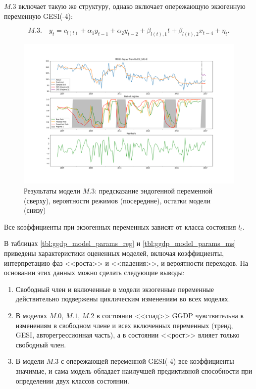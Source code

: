 \documentclass[a4paper,14pt]{extreport}
\begin{document}
$M.3$ включает такую же структуру, однако включает опережающую экзогенную переменную GESI(-4):

\begin{equation}
	M.3. \quad y_t = c_{l(t)} + \alpha_1 y_{t-1} + \alpha_2 y_{t-2} + \beta_{l(t), 1} t + \beta_{l(t), 2} x_{t-4} + \eta_t .
\end{equation}

\begin{figure}[H]
	\includegraphics[width=\linewidth]{img/manual/model_m3.png}
	\caption{Результаты модели $M.3$: предсказание эндогенной переменной (сверху), вероятности режимов (посередине), остатки модели (снизу)}
	\label{fig:sm_model_m3}
\end{figure}

Все коэффициенты при экзогенных переменных зависят от класса состояния $l_t$.

В таблицах \ref{tbl:ggdp_model_params_reg} и \ref{tbl:ggdp_model_params_ms} приведены характеристики оцененных моделей, включая коэффициенты, интерпретацию фаз <<роста>> и <<падения>>, и вероятности переходов. На основании этих данных можно сделать следующие выводы:

\begin{enumerate}
	\item Свободный член и включенные в модели экзогенные переменные действительно подвержены циклическим изменениям во всех моделях.
	\item В моделях $M.0$, $M.1$, $M.2$ в состоянии <<спад>> GGDP чувствительна к изменениям в свободном члене и всех включенных переменных (тренд, GESI, авторегрессионная часть), а в состоянии <<рост>> влияет только свободный член.
	\item В модели $M.3$ с опережающей переменной GESI(-4) все коэффициенты значимые, и сама модель обладает наилучшей предиктивной способности при определении двух классов состоянии.
\end{enumerate}
\end{document}

